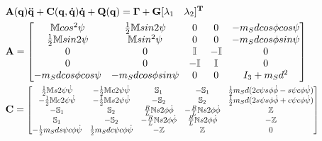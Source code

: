 \documentclass[a4paper,10pt]{article}
\newcommand\scalemath[2]{\scalebox{#1}{\mbox{\ensuremath{\displaystyle #2}}}}
\begin{document}
\begin{align}
 &\mathbf{A(q)\ddot{q}+C(q,\dot{q})\dot{q}+Q(q) = \Gamma + G[\begin{matrix} \lambda_1 & \lambda_2 \end{matrix}]^T} \\
 &\mathbf{A}= \left[\begin{matrix}
           \mathbb{M}cos^2\psi &  \frac{1}{2}\mathbb{M}sin2\psi &           0 &           0 & -m_Sdcos\phi cos\psi \\
 \frac{1}{2}\mathbb{M}sin2\psi &            \mathbb{M}sin^2\psi &           0 &           0 & -m_Sdcos\phi sin\psi \\
                             0 &                              0 &  \mathbb{I} & -\mathbb{I} & 0 \\
                             0 &                              0 & -\mathbb{I} &  \mathbb{I} & 0 \\
          -m_Sdcos\phi cos\psi &           -m_Sdcos\phi sin\psi &           0 &           0 & I_3+m_Sd^2   
   \end{matrix}\right] \nonumber \\
 &\mathbf{C}= \scalemath{0.8}{\left[\begin{matrix}
    \frac{1}{2}\mathbb{M}s2\psi\dot\psi & -\frac{1}{2}\mathbb{M}c2\psi\dot\psi &                         \mathbb{S}_1 &                        -\mathbb{S}_1 & \frac{1}{2}m_Sd(2c\psi s\phi\dot\phi-s\psi c\phi\dot\psi) \\
   -\frac{1}{2}\mathbb{M}c2\psi\dot\psi & -\frac{1}{2}\mathbb{M}s2\psi\dot\psi &                        -\mathbb{S}_2 &                         \mathbb{S}_2 & \frac{1}{2}m_Sd(2s\psi s\phi\dot\phi+c\psi c\phi\dot\psi) \\
                          -\mathbb{S}_1 &                         \mathbb{S}_2 &  \frac{R}{L}\mathbb{N}s2\phi\dot\phi & -\frac{R}{L}\mathbb{N}s2\phi\dot\phi &                                                \mathbb{Z} \\
                           \mathbb{S}_1 &                        -\mathbb{S}_2 & -\frac{R}{L}\mathbb{N}s2\phi\dot\phi &  \frac{R}{L}\mathbb{N}s2\phi\dot\phi &                                               -\mathbb{Z} \\
   -\frac{1}{2}m_Sds\psi c\phi\dot\psi  &   \frac{1}{2}m_Sdc\psi c\phi\dot\psi &                          -\mathbb{Z} &                           \mathbb{Z} &                                                         0   
     \end{matrix}\right]}  \nonumber \\

\end{align}
\end{document}
